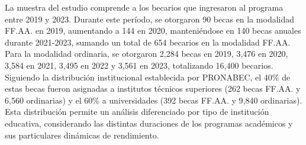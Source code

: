 \documentclass[12pt, a4paper]{article} %
\begin{document}
La muestra del estudio comprende a los becarios que ingresaron al programa entre 2019 y 2023. Durante este período, se otorgaron 90 becas en la modalidad FF.AA. en 2019, aumentando a 144 en 2020, manteniéndose en 140 becas anuales durante 2021-2023, sumando un total de 654 becarios en la modalidad FF.AA. Para la modalidad ordinaria, se otorgaron 2,284 becas en 2019, 3,476 en 2020, 3,584 en 2021, 3,495 en 2022 y 3,561 en 2023, totalizando 16,400 becarios. Siguiendo la distribución institucional establecida por PRONABEC, el 40\% de estas becas fueron asignadas a institutos técnicos superiores (262 becas FF.AA. y 6,560 ordinarias) y el 60\% a universidades (392 becas FF.AA. y 9,840 ordinarias). Esta distribución permite un análisis diferenciado por tipo de institución educativa, considerando las distintas duraciones de los programas académicos y sus particulares dinámicas de rendimiento.
\end{document}

